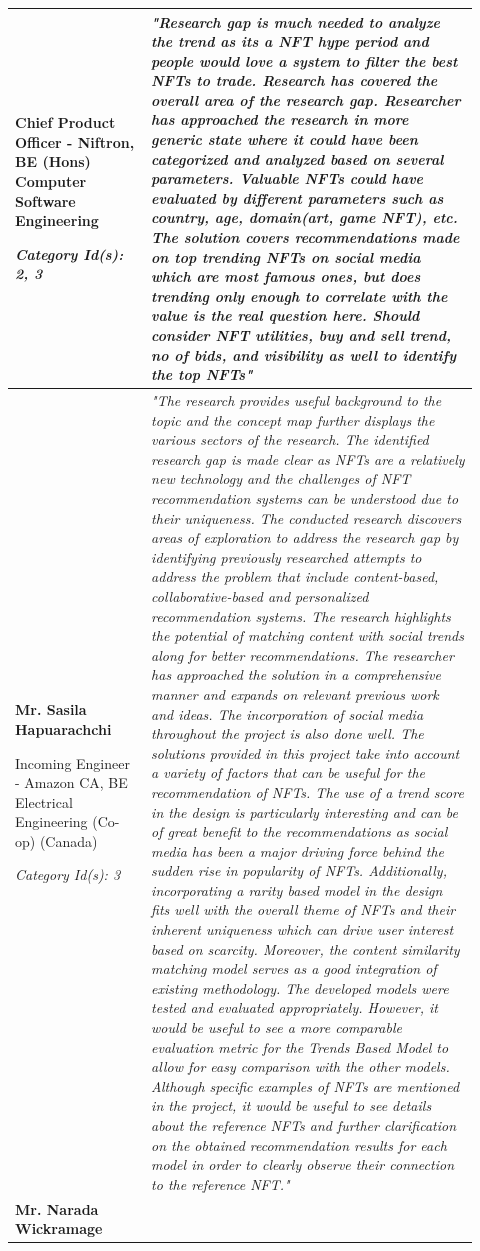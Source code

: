 \begin{longtable}{|p{0.27\linewidth}|p{0.655\linewidth}|}
Chief Product Officer - Niftron, BE (Hons) Computer Software Engineering

\textit{Category Id(s): 2, 3}
 &
 \textit{"Research gap is much needed to analyze the trend as its a NFT hype period and people would love a system to filter the best NFTs to trade. Research has covered the overall area of the research gap. Researcher has approached the research in more generic state where it could have been categorized and analyzed based on several parameters. Valuable NFTs could have evaluated by different parameters such as country, age, domain(art, game NFT), etc. The solution covers recommendations made on top trending NFTs on social media which are most famous ones, but does trending only enough to correlate with the value is the real question here. Should consider NFT utilities, buy and sell trend, no of bids, and visibility as well to identify the top NFTs"}
 \\
\hline
\textbf{Mr. Sasila Hapuarachchi}

 Incoming Engineer - Amazon CA,
 BE Electrical Engineering (Co-op) (Canada)

\textit{Category Id(s): 3}
 & 
 \textit{"The research provides useful background to the topic and the concept map further displays the various sectors of the research. The identified research gap is made clear as NFTs are a relatively new technology and the challenges of NFT recommendation systems can be understood due to their uniqueness. 
 The conducted research discovers areas of exploration to address the research gap by identifying previously researched attempts to address the problem that include content-based, collaborative-based and personalized recommendation systems. The research highlights the potential of matching content with social trends along for better recommendations. 
 The researcher has approached the solution in a comprehensive manner and expands on relevant previous work and ideas. The incorporation of social media throughout the project is also done well.
 The solutions provided in this project take into account a variety of factors that can be useful for the recommendation of NFTs. The use of a trend score in the design is particularly interesting and can be of great benefit to the recommendations as social media has been a major driving force behind the sudden rise in popularity of NFTs. Additionally, incorporating a rarity based model in the design fits well with the overall theme of NFTs and their inherent uniqueness which can drive user interest based on scarcity. Moreover, the content similarity matching model serves as a good integration of existing methodology.
 The developed models were tested and evaluated appropriately. However, it would be useful to see a more comparable evaluation metric for the Trends Based Model to allow for easy comparison with the other models.
 Although specific examples of NFTs are mentioned in the project, it would be useful to see details about the reference NFTs and further clarification on the obtained recommendation results for each model in order to clearly observe their connection to the reference NFT."}
 \\
 \hline
\textbf{Mr. Narada Wickramage}


\end{longtable}
